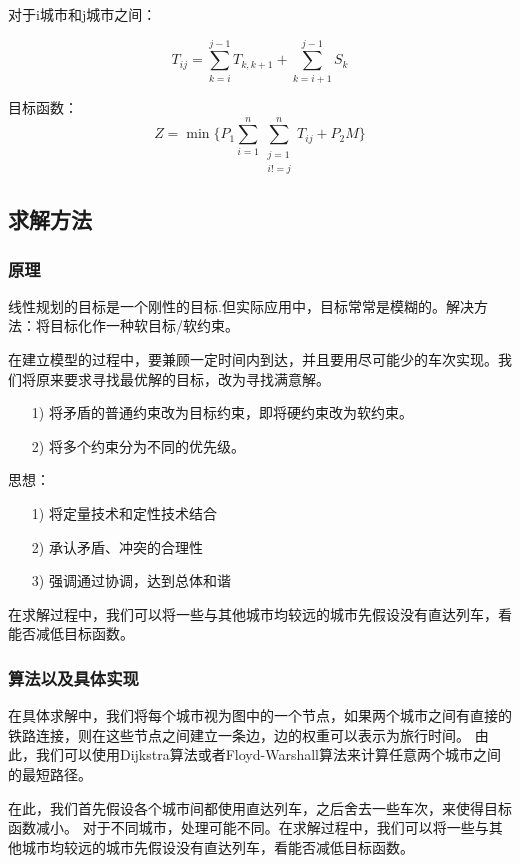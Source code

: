 \documentclass[12pt, a4paper, oneside]{ctexart}
\begin{document}
对于i城市和j城市之间：

$$T_{ij} = \sum_{k=i}^{j-1}T_{k,k+1} + \sum_{k=i+1}^{j-1}S_k $$

目标函数：
$$Z =\min_{}\{ P_1 \sum_{i=1}^{n} \sum_{\begin{matrix}
    j=1\\i!=j
   \end{matrix}}^{n} T_{ij} + P_2 M\}$$

\subsection{求解方法} 
\subsubsection{原理}
线性规划的目标是一个刚性的目标.但实际应用中，目标常常是模糊的。解决方法：将目标化作一种软目标/软约束。

在建立模型的过程中，要兼顾一定时间内到达，并且要用尽可能少的车次实现。我们将原来要求寻找最优解的目标，改为寻找满意解。

\begin{itemize}
    \item [1)] 
    将矛盾的普通约束改为目标约束，即将硬约束改为软约束。 
    \item [2)]
    将多个约束分为不同的优先级。
\end{itemize}

思想：

\begin{itemize}
    \item [1)] 
    将定量技术和定性技术结合
    \item [2)]
    承认矛盾、冲突的合理性
    \item [3)]
    强调通过协调，达到总体和谐
\end{itemize}
在求解过程中，我们可以将一些与其他城市均较远的城市先假设没有直达列车，看能否减低目标函数。
\subsubsection{算法以及具体实现}

在具体求解中，我们将每个城市视为图中的一个节点，如果两个城市之间有直接的铁路连接，则在这些节点之间建立一条边，边的权重可以表示为旅行时间。
由此，我们可以使用Dijkstra算法或者Floyd-Warshall算法来计算任意两个城市之间的最短路径。

在此，我们首先假设各个城市间都使用直达列车，之后舍去一些车次，来使得目标函数减小。
对于不同城市，处理可能不同。在求解过程中，我们可以将一些与其他城市均较远的城市先假设没有直达列车，看能否减低目标函数。
\end{document}
